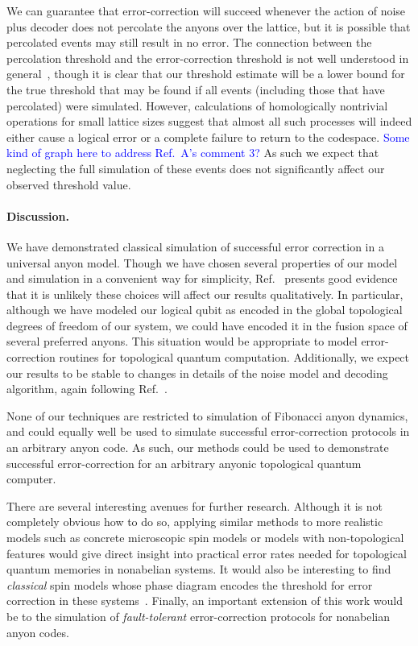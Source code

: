 \documentclass[aps, prl, letterpaper, twocolumn, superscriptaddress, notitlepage, 10pt]{revtex4-1}
\newcommand{\cggb}[1]{\textcolor{blue}{#1}}
\begin{document}
We can guarantee that error-correction will succeed whenever
the action of noise plus decoder 
does not percolate the anyons over the lattice,
but it is possible that percolated events may still result in no error. 
The connection between the percolation threshold and the error-correction threshold 
is not well understood in general~\cite{Hastings2014}, though it is clear 
that our threshold estimate will be a lower bound for 
the true threshold that may be found if all events 
(including those that have percolated) were simulated. 
However, calculations of homologically nontrivial operations for small lattice sizes suggest that almost all such 
processes will indeed either cause a logical error or a complete failure to return to the codespace.
\cggb{Some kind of graph here to address Ref.~A's comment 3?}
As such we expect that neglecting the full simulation of 
these events does not significantly affect our observed threshold value.

\paragraph{Discussion.}

We have demonstrated classical simulation of successful error correction in a universal anyon model. 
Though we have chosen several properties of our model and 
simulation in a convenient way for simplicity,
Ref.~\cite{Brell2013} presents good evidence that it is
unlikely these choices will affect our results qualitatively.
In particular, although we have modeled our logical qubit as 
encoded in the global topological degrees of freedom of our 
system, we could have encoded it in the fusion space of several preferred anyons. 
This situation would be appropriate to model error-correction routines for topological quantum computation. 
Additionally, we expect our results to be stable to changes in details of the noise model and decoding algorithm, again following Ref.~\cite{Brell2013}.

None of our techniques are restricted to simulation of Fibonacci anyon dynamics, and could 
equally well be used to simulate successful error-correction protocols in an arbitrary anyon code. 
As such, our methods could be used to demonstrate successful 
error-correction for an arbitrary anyonic topological quantum computer.

There are several interesting avenues for further research. 
Although it is not completely obvious how to do so, 
applying similar methods to more realistic models such as concrete 
microscopic spin models or models with non-topological features would give 
direct insight into practical error rates needed for topological quantum memories in nonabelian systems. 
It would also be interesting to find \emph{classical} spin models 
whose phase diagram encodes the threshold for error correction in these systems~\cite{Dennis2002}.
Finally, an important extension of this work would be to the simulation of \emph{fault-tolerant} error-correction protocols for nonabelian anyon codes. 
\end{document}
